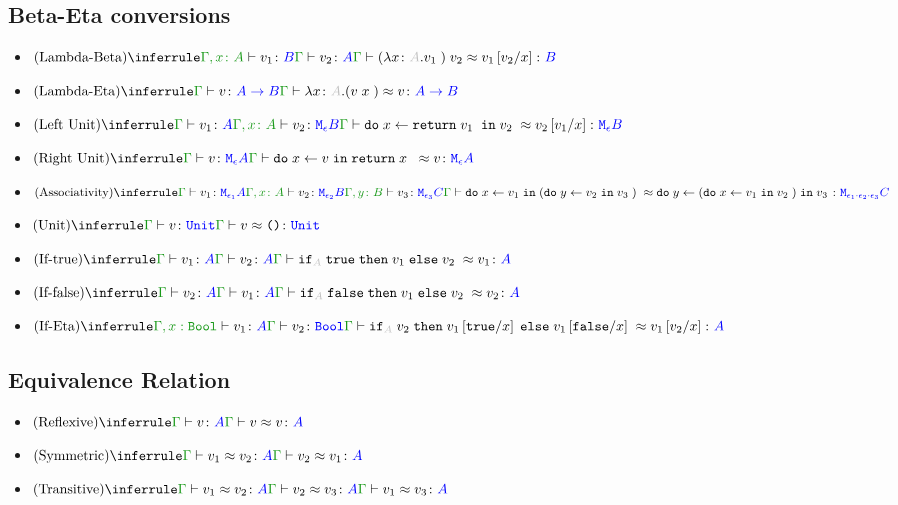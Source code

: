 \documentclass{report}
\begin{document}
\subsection{Beta-Eta conversions}
\begin{itemize}
    \item $\ntreeruleII{Lambda-Beta}{\typerelation{\gax}{v_1}{B}}{\gtyperelation{v_2}{A}}{\gberelation{\apply{(\lam{x}{A}{v_1})}{v_2} }{ v_1\ssub{x}{v_2}}{B}}$
    
    \item $\ntreeruleI{Lambda-Eta}{\gtyperelation{v}{\ab}}{\gberelation{\lam{x}{A}{(\apply{v}{x}})}{v}{\ab}}$
 

    \item $\ntreeruleII{Left Unit}{\gtyperelation{v_1}{A}}{\typerelation{\gax}{v_2}{\meb}}{\gberelation{\doin{x}{\return{v_1}}{v_2}}{v_2\ssub{x}{v_1}}{\meb}}$
    
    \item $\ntreeruleI{Right Unit}{\gtyperelation{v}{\mea}}{\gberelation{\doin{x}{v}{\return{x}} }{v}{\mea}}$
    \item $\ntreeruleIII{Associativity}{
            \gtyperelation{v_1}{\M{\e_1}{A}} 
        }{
            \typerelation{\gax}{v_2}{\M{\e_2}{B}}
        }{
            \typerelation{\gby}{v_3}{\M{\e_3}{C}}
        }{
        \gberelation{\doin{x}{v_1}{(\doin{y}{v_2}{v_3})}}{\doin{y}{(\doin{x}{v_1}{v_2})}{v_3}}{\M{\e_1 \dot \e_2 \dot \e_3}{C}}
    }$

    \item $\ntreeruleI{Unit}{\gtyperelation{v}{\U}}{\gberelation{v}{\u}{\U}}$

    \item $\ntreeruleII{If-true}{\gtyperelation{v_1}{ A}}{\gtyperelation{v_2}{ A}}{\gberelation{\pifthenelse{A}{\t}{v_1}{v_2}}{v_1}{ A}}$
    
    \item $\ntreeruleII{If-false}{\gtyperelation{v_2}{ A}}{\gtyperelation{v_1}{ A}}{\gberelation{\pifthenelse{A}{\f}{v_1}{v_2}}{v_2}{ A}}$
    
    \item $\ntreeruleII{If-Eta}{\typerelation{\G, x: \B}{v_1}{ A}}{\gtyperelation{v_2}{\B}}{\gberelation{\pifthenelse{A}{v_2}{v_1\ssub{x}{\t}}{v_1\ssub{x}{\f}}}{v_1\ssub{x}{v_2}}{ A}}$
    
\end{itemize}
\subsection{Equivalence Relation}
\begin{itemize}
    \item $\ntreeruleI{Reflexive}{\gtyperelation{v}{A}}{\gberelation{v}{v}{A}}$
    \item $\ntreeruleI{Symmetric}{\gberelation{v_1}{v_2}{A}}{\gberelation{v_2}{v_1}{A}}$
    \item $\ntreeruleII{Transitive}{\gberelation{v_1}{v_2}{A}}{\gberelation{v_2}{v_3}{A}}{\gberelation{v_1}{v_3}{A}}$
\end{itemize}
\end{document}
